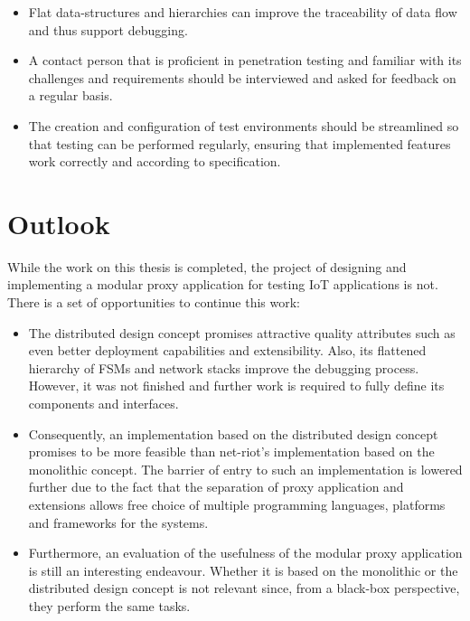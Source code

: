 \begin{itemize}
    \item Flat data-structures and hierarchies can improve the traceability of data flow and thus support debugging.
    \item A contact person that is proficient in penetration testing and familiar with its challenges and requirements should be interviewed and asked for feedback on a regular basis.
    \item The creation and configuration of test environments should be streamlined so that testing can be performed regularly, ensuring that implemented features work correctly and according to specification.
\end{itemize}

\section{Outlook}
\label{sec:outlook}
While the work on this thesis is completed, the project of designing and implementing a modular proxy application for testing \ac{IoT} applications is not. There is a set of opportunities to continue this work:
\begin{itemize}
    \item The distributed design concept promises attractive quality attributes such as even better deployment capabilities and extensibility. Also, its flattened hierarchy of \acp{FSM} and network stacks improve the debugging process. However, it was not finished and further work is required to fully define its components and interfaces.
    \item Consequently, an implementation based on the distributed design concept promises to be more feasible than net-riot's implementation based on the monolithic concept. The barrier of entry to such an implementation is lowered further due to the fact that the separation of proxy application and extensions allows free choice of multiple programming languages, platforms and frameworks for the systems.
    \item Furthermore, an evaluation of the usefulness of the modular proxy application is still an interesting endeavour. Whether it is based on the monolithic or the distributed design concept is not relevant since, from a black-box perspective, they perform the same tasks.
\end{itemize}